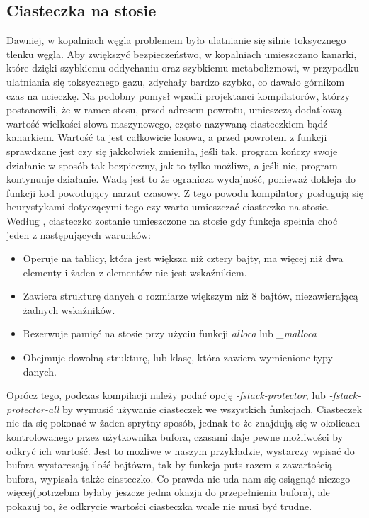 \documentclass[polish]{kbk}
\begin{document}
\subsection{Ciasteczka na stosie}
Dawniej, w kopalniach węgla problemem było ulatnianie się silnie toksycznego tlenku węgla. Aby zwiększyć bezpieczeństwo, w kopalniach umieszczano kanarki, które dzięki szybkiemu oddychaniu oraz szybkiemu metabolizmowi, w przypadku ulatniania się toksycznego gazu, zdychały bardzo szybko, co dawało górnikom czas na ucieczkę. Na podobny pomysł wpadli projektanci kompilatorów, którzy postanowili, że w ramce stosu, przed adresem powrotu, umieszczą dodatkową wartość wielkości słowa maszynowego, często nazywaną ciasteczkiem bądź kanarkiem. Wartość ta jest całkowicie losowa, a przed powrotem z funkcji sprawdzane jest czy się jakkolwiek zmieniła, jeśli tak, program kończy swoje działanie w sposób tak bezpieczny, jak to tylko możliwe, a jeśli nie, program kontynuuje działanie. Wadą jest to że ogranicza wydajność, ponieważ dokleja do funkcji kod powodujący narzut czasowy. Z tego powodu kompilatory posługują się heurystykami dotyczącymi tego czy warto umieszczać ciasteczko na stosie. Według \cite{cookie}, ciasteczko zostanie umieszczone na stosie gdy funkcja spełnia choć jeden z następujących warunków:
\begin{itemize}
\item Operuje na tablicy, która jest większa niż cztery bajty, ma więcej niż dwa elementy i żaden z elementów nie jest wskaźnikiem.
\item Zawiera strukturę danych o rozmiarze większym niż 8 bajtów, niezawierającą żadnych wskaźników.
\item Rezerwuje pamięć na stosie przy użyciu funkcji \emph{alloca} lub \emph{\_malloca}
\item Obejmuje dowolną strukturę, lub klasę, która zawiera wymienione typy danych.
\end{itemize}
Oprócz tego, podczas kompilacji należy podać opcję \textit{-fstack-protector}, lub \textit{-fstack-protector-all} by wymusić używanie ciasteczek we wszystkich funkcjach.
Ciasteczek nie da się pokonać w żaden sprytny sposób, jednak to że znajdują się w okolicach kontrolowanego przez użytkownika bufora, czasami daje pewne możliwości by odkryć ich wartość. Jest to możliwe w naszym przykładzie, wystarczy wpisać do bufora wystarczają ilość bajtówm, tak by funkcja puts razem z zawartością bufora, wypisała także ciasteczko. Co prawda nie uda nam się osiągnąć niczego więcej(potrzebna byłaby jeszcze jedna okazja do przepełnienia bufora), ale pokazuj to, że odkrycie wartości ciasteczka wcale nie musi być trudne.\newline
\end{document}
